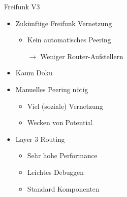 \begin{frame}{Freifunk V3}
    \begin{itemize}
        \item Zukünftige Freifunk Vernetzung
        \begin{itemize}
            \item Kein automatisches Peering
            \item[$\rightarrow$] Weniger Router-Aufstellern
        \end{itemize}
        \item Kaum Doku
        \item Manuelles Peering nötig
        \begin{itemize}
            \item Viel (soziale) Vernetzung
            \item Wecken von Potential
        \end{itemize}
        \item Layer 3 Routing
        \begin{itemize}
            \item Sehr hohe Performance
            \item Leichtes Debuggen
            \item Standard Komponenten
        \end{itemize}
    \end{itemize}
\end{frame}
